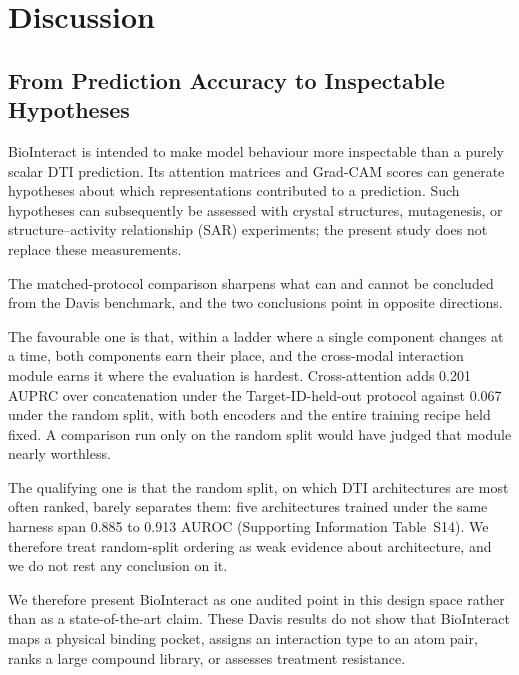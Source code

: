 \documentclass[fleqn,10pt]{wlscirep}
\begin{document}
\section{Discussion}
\label{sec:discussion}

\subsection{From Prediction Accuracy to Inspectable Hypotheses}

BioInteract is intended to make model behaviour more inspectable than a purely
scalar DTI prediction.  Its attention matrices and Grad-CAM scores can generate
hypotheses about which representations contributed to a prediction.  Such
hypotheses can subsequently be assessed with crystal structures, mutagenesis,
or structure--activity relationship (SAR) experiments; the present study does
not replace these measurements.

\begingroup\color{red}
The matched-protocol comparison sharpens what can and cannot be concluded from
the Davis benchmark, and the two conclusions point in opposite directions.

The favourable one is that, within a ladder where a single component changes at
a time, both components earn their place, and the cross-modal interaction module
earns it where the evaluation is hardest.  Cross-attention adds 0.201 AUPRC over
concatenation under the Target-ID-held-out protocol against 0.067 under the
random split, with both encoders and the entire training recipe held fixed.  A
comparison run only on the random split would have judged that module nearly
worthless.

The qualifying one is that the random split, on which DTI architectures are most
often ranked, barely separates them: five architectures trained under the same
harness span 0.885 to 0.913 AUROC (Supporting Information Table~S14).  We
therefore treat random-split ordering as weak evidence about architecture, and
we do not rest any conclusion on it.

We therefore present BioInteract as one audited point in this design space
rather than as a state-of-the-art claim.  These Davis results
do not show that BioInteract maps a physical binding pocket, assigns an
interaction type to an atom pair, ranks a large compound library, or assesses
treatment resistance.
\endgroup
\end{document}
